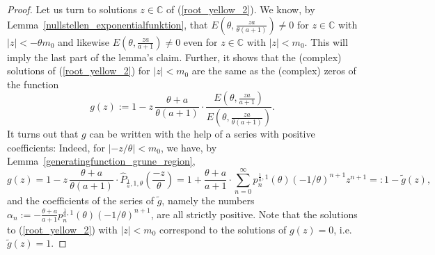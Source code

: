 \documentclass[12pt]{article}
\newcommand{\C}{\mathbb{C}} %
\newcommand{\1}{\mathds{1}}
\theoremstyle{definition}
\theoremstyle{plain}
\theoremstyle{remark}
\begin{document}
\begin{proof}
Let us turn to solutions $z\in\C$ of (\ref{root_yellow_2}). We know, by Lemma~\ref{nullstellen_exponentialfunktion}, that $E(\theta,\frac{za}{\theta(a+1)})\neq 0$ for $z\in\C$ with $|z|<-\theta m_0$ and likewise $E(\theta,\frac{za}{a+1})\neq 0$ even for $z\in\C$ with $|z|<m_0$. This will imply the last part of the lemma's claim. Further, it shows that the (complex) solutions of (\ref{root_yellow_2}) for $|z|<m_0$ are the same as the (complex) zeros of the function
$$
g(z) :=  1 - z \,\frac{\theta+a}{\theta(a+1)} \cdot \frac{E\left(\theta,\frac{za}{a+1}\right)}{E\left(\theta,\frac{za}{\theta(a+1)}\right)}.
$$
It turns out that $g$ can be written with the help of a series with positive coefficients: Indeed, for $|-z/\theta|<m_0$, we have, by Lemma~\ref{generatingfunction_grune_region},
$$
g(z) =  1 - z \,\frac{\theta+a}{\theta(a+1)} \cdot \hat P_{\frac{1}{a},1,\theta}\left(\frac{-z}{\theta}\right) =  1 + \frac{\theta+a}{ a+1} \cdot \sum_{n=0}^\infty p_n^{\frac{1}{a},1}(\theta) (-1/\theta)^{n+1} z^{n+1} =: 1 - \tilde g(z),
$$
and the coefficients of the series of $\tilde g$, namely the numbers $\alpha_n:=-\frac{\theta+a}{a+1} p_n^{\frac{1}{a},1}(\theta) (-1/\theta)^{n+1}$, are all strictly positive. Note that the solutions to (\ref{root_yellow_2}) with $|z|<m_0$ correspond to the solutions of $g(z)=0$, i.e.\ $\tilde g(z)=1$.


\end{proof}
\end{document}
